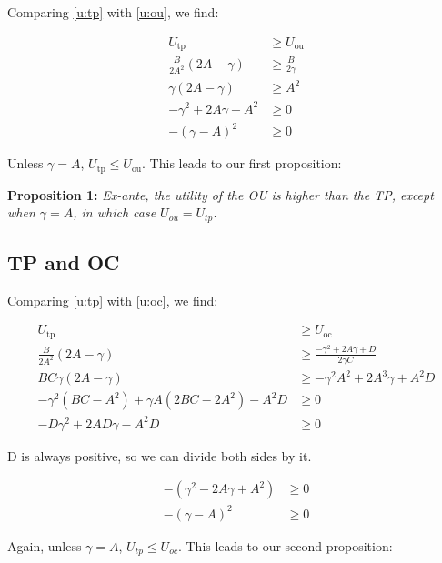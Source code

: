 \documentclass[12pt,oneside,a4paper]{memoir}
\begin{document}
Comparing \eqref{u:tp} with \eqref{u:ou}, we find:

\vspace{-18 pt}
\begin{align*}
U_{\mathrm{tp}} & \geq U_{\mathrm{ou}}
\\
\frac{B}{2A^2} (2A - \gamma) & \geq	\frac{B}{2\gamma}  
\\
\gamma (2A - \gamma) & \geq	A^2  
\\
-\gamma^2 + 2A\gamma - A^2 & \geq 0
\\
-(\gamma - A)^2 & \geq 0
\end{align*}

\noindent
Unless $\gamma = A$, $U_{\mathrm{tp}}  \leq U_{\mathrm{ou}}$.
This leads to our first proposition:

\vspace{18pt} \noindent
\textbf{Proposition 1:}
\textit{Ex-ante, the utility of the OU is higher than the TP, except when $\gamma = A$, in which case $U_{ou}=U_{tp}$.}

\subsection*{TP and OC}

Comparing \eqref{u:tp} with \eqref{u:oc}, we find:

\vspace{-18 pt}
\begin{align*}
U_{\mathrm{tp}} & \geq U_{\mathrm{oc}}
\\
\frac{B}{2A^2} (2A - \gamma) & \geq	\frac{-\gamma^2 + 2A\gamma + D}{2\gamma C} 
\\
BC \gamma (2A - \gamma) & \geq -\gamma^2A^2 + 2A^3\gamma + A^2 D
\\
- \gamma^2(BC - A^2) + \gamma A(2BC - 2A^2) - A^2 D & \geq 0
\\
-D \gamma^2 + 2AD \gamma - A^2 D & \geq 0
\end{align*}

\noindent 
D is always positive, so we can divide both sides by it.

\vspace{-18 pt}
\begin{align*}
-(\gamma^2 - 2A \gamma + A^2) & \geq 0
\\
-(\gamma - A)^2 & \geq 0
\end{align*}

\noindent
Again, unless $\gamma = A$, $U_{tp}  \leq U_{oc}$.
This leads to our second proposition:
\end{document}
